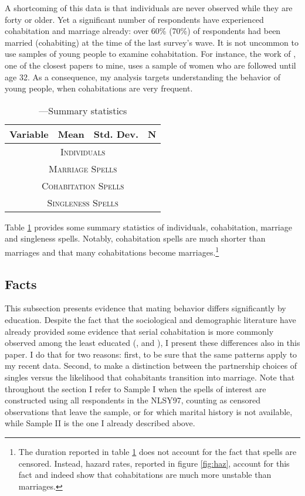 \documentclass[12pt]{article}
\begin{document}
   A shortcoming of this data is that individuals are never observed while they are forty or older. Yet a significant number of respondents have experienced cohabitation and marriage already: over 60\% (70\%) of respondents had been married (cohabiting) at the time of the last survey's wave. It is not uncommon to use samples of young people to examine cohabitation. For instance, the work of \cite{brien2006}, one of the closest papers to mine, uses a sample of women who are followed until age 32. As a consequence, my analysis targets understanding the behavior of young people, when cohabitations are very frequent.   
      \begin{table}[h!]\centering \small\caption{---Summary statistics}\label{table:stat}
   	{\begin{tabular}{l c c c}\hline\hline
   			\multicolumn{1}{l}{\textbf{Variable}} & \textbf{Mean} & \textbf{Std. Dev.} & \textbf{N}\\ \hline\hline
   			\multicolumn{4}{c}{\textsc{Individuals}}\\
   			\hline
   			
   			\hline
   			\multicolumn{4}{c}{\textsc{Marriage Spells}}\\
   			\hline
   			
   			\hline
   			\multicolumn{4}{c}{\textsc{Cohabitation Spells}}\\
   			\hline
   			
   			\hline
   			\multicolumn{4}{c}{\textsc{Singleness Spells}}\\
   			\hline
   			
   			\hline
   	\end{tabular}}
   \end{table} 
  Table \ref{table:stat} provides some summary statistics of individuals, cohabitation, marriage and singleness spells. Notably,  cohabitation spells are much shorter than marriages and that many cohabitations become marriages.\footnote{The duration reported in table \ref{table:stat} does not account for the fact that spells are censored. Instead, hazard rates, reported in figure \ref{fig:haz}, account for this fact and indeed show that cohabitations are much more unstable than marriages.}

\subsection{Facts}\label{subsection:facts}
This subsection presents evidence that mating behavior differs significantly by education. Despite the fact that the sociological and demographic literature have already provided some evidence that serial cohabitation is more commonly observed among the least educated (\cite{bumpass2000}, \cite{lichter2010} and \cite{perelli2016}), I present these differences also in this paper. I do that for two reasons: first, to be sure that the same patterns apply to my recent data. Second, to make a distinction between the partnership choices of singles versus the likelihood that cohabitants transition into marriage. Note that throughout the section I refer to Sample I when the spells of interest are constructed using all respondents in the NLSY97, counting as censored observations that leave the sample, or for which marital history is not available, while Sample II is the one I already described above.
\end{document}
